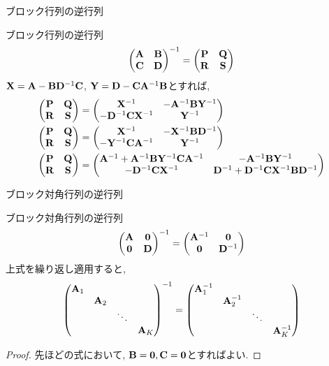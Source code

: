 \documentclass[dvipdfmx,notheorems,t]{beamer}
\begin{document}
\begin{frame}{ブロック行列の逆行列}
\begin{block}{ブロック行列の逆行列}
  $$\mqty(\vb{A} & \vb{B} \\ \vb{C} & \vb{D})^{-1} = \mqty(\vb{P} & \vb{Q} \\ \vb{R} & \vb{S})$$
  $\vb{X} = \vb{A} - \vb{B} \vb{D}^{-1} \vb{C}$, $\vb{Y} = \vb{D} - \vb{C} \vb{A}^{-1} \vb{B}$とすれば,
  \begin{align*}
    \mqty(\vb{P} & \vb{Q} \\ \vb{R} & \vb{S})
      &= \mqty(\vb{X}^{-1} & -\vb{A}^{-1} \vb{B} \vb{Y}^{-1} \\
        -\vb{D}^{-1} \vb{C} \vb{X}^{-1} & \vb{Y}^{-1}) \\
    \mqty(\vb{P} & \vb{Q} \\ \vb{R} & \vb{S})
      &= \mqty(\vb{X}^{-1} & -\vb{X}^{-1} \vb{B} \vb{D}^{-1} \\
        -\vb{Y}^{-1} \vb{C} \vb{A}^{-1} & \vb{Y}^{-1}) \\
    \mqty(\vb{P} & \vb{Q} \\ \vb{R} & \vb{S})
      &= \mqty(\vb{A}^{-1} + \vb{A}^{-1} \vb{B} \vb{Y}^{-1} \vb{C} \vb{A}^{-1} &
        -\vb{A}^{-1} \vb{B} \vb{Y}^{-1} \\
        -\vb{D}^{-1} \vb{C} \vb{X}^{-1} &
        \vb{D}^{-1} + \vb{D}^{-1} \vb{C} \vb{X}^{-1} \vb{B} \vb{D}^{-1})
  \end{align*}
\end{block}
\end{frame}

\begin{frame}{ブロック対角行列の逆行列}
\begin{block}{ブロック対角行列の逆行列}
  $$\mqty(\vb{A} & \vb{0} \\ \vb{0} & \vb{D})^{-1}
  = \mqty(\vb{A}^{-1} & \vb{0} \\ \vb{0} & \vb{D}^{-1})$$
  上式を繰り返し適用すると,
  $$\mqty(\dmat{\vb{A}_1, \vb{A}_2, \ddots, \vb{A}_K})^{-1}
    = \mqty(\dmat{\vb{A}_1^{-1}, \vb{A}_2^{-1}, \ddots, \vb{A}_K^{-1}})$$
\end{block}

\begin{proof}
先ほどの式において, $\vb{B} = \vb{0}, \vb{C} = \vb{0}$とすればよい.
\end{proof}
\end{frame}
\end{document}
